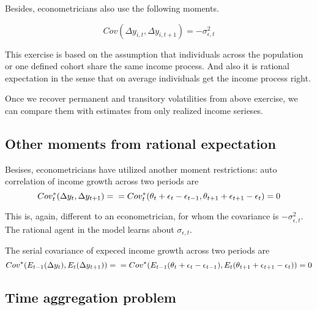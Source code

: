 \documentclass[12pt,notitlepage,onecolumn,aps,pra]{revtex4-1}
\begin{document}
Besides, econometricians also use the following moments.

\begin{equation}
Cov (\Delta y_{i,t}, \Delta y_{i,t+1}) =  -\sigma^2_{\epsilon,t}
\end{equation}

This exercise is based on the assumption that individuals across the
population or one defined cohort share the same income process. And also
it is rational expectation in the sense that on average individuals get
the income process right.

Once we recover permanent and transitory volatilities from above
exercise, we can compare them with estimates from only realized income
serieses.

\hypertarget{other-moments-from-rational-expectation}{%
\subsection{Other moments from rational
expectation}\label{other-moments-from-rational-expectation}}

Besises, econometricians have utilized another moment restrictions: auto
correlation of income growth across two periods are \begin{equation}
Cov^*_{t}( \Delta y_t, \Delta y_{t+1} ) = \\
 = Cov^*_{t}(\theta_t + \epsilon_t - \epsilon_{t-1}, \theta_{t+1} + \epsilon_{t+1} - \epsilon_{t}) \\
 = 0 
\end{equation}

This is, again, different to an econometrician, for whom the covariance
is \(-\sigma^2_{\epsilon,t}\). The rational agent in the model learns
about \(\sigma_{\epsilon,t}\).

The serial covariance of expeced income growth across two periods are
\begin{equation}
Cov^*( E_{t-1}(\Delta y_t), E_t(\Delta y_{t+1}) ) = \\
= Cov^*(E_{t-1}(\theta_t +\epsilon_t - \epsilon_{t-1}), E_{t}(\theta_{t+1} + \epsilon_{t+1} - \epsilon_t)) \\
= 0
\end{equation}

    \hypertarget{time-aggregation-problem}{%
\subsection{Time aggregation problem}\label{time-aggregation-problem}}
\end{document}
